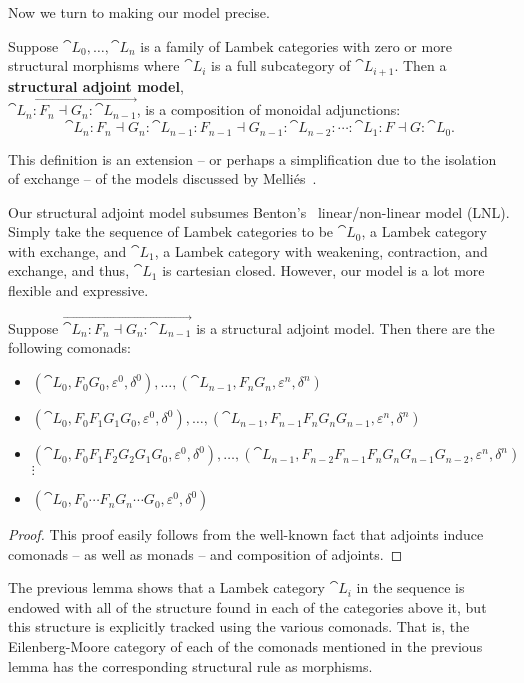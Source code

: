 Now we turn to making our model precise.
\begin{definition}
  \label{def:model}  
  Suppose $\cat{L}_0, \ldots, \cat{L}_n$ is a family of Lambek
  categories with zero or more structural morphisms where $\cat{L}_i$
  is a full subcategory of $\cat{L}_{i+1}$.  Then a \textbf{structural
    adjoint model}, \\ $\overrightarrow{\cat{L}_n : F_n \dashv G_n : \cat{L}_{n-1}}$, is a composition of monoidal adjunctions:
  \[ \cat{L}_n : F_n \dashv G_n : \cat{L}_{n-1} : F_{n-1} \dashv G_{n-1} : \cat{L}_{n-2} : \cdots : \cat{L}_1 : F \dashv G : \cat{L}_0. \]
\end{definition}
This definition is an extension -- or perhaps a simplification due to
the isolation of exchange -- of the models discussed by
Melli\'es~\cite{MELLIES2004202}.

Our structural adjoint model subsumes Benton's~\cite{Benton:1994}
linear/non-linear model (LNL).  Simply take the sequence of Lambek
categories to be $\cat{L}_0$, a Lambek category with exchange, and
$\cat{L}_1$, a Lambek category with weakening, contraction, and
exchange, and thus, $\cat{L}_1$ is cartesian closed.  However, our
model is a lot more flexible and expressive.

\begin{lemma}
  \label{lemma:comonads_in_a_structural_adjoint_model}
  Suppose $\overrightarrow{\cat{L}_n : F_n \dashv G_n : \cat{L}_{n-1}}$ is a structural adjoint model.  Then
  there are the following comonads:  
  \begin{itemize}
  \item $(\cat{L}_0, F_0G_0, \varepsilon^0, \delta^0), \ldots, (\cat{L}_{n-1}, F_nG_n, \varepsilon^{n}, \delta^{n})$
  \item $(\cat{L}_0, F_0F_1G_1G_0, \varepsilon^0, \delta^0), \ldots, (\cat{L}_{n-1}, F_{n-1}F_nG_nG_{n-1}, \varepsilon^{n}, \delta^{n})$
  \item $(\cat{L}_0, F_0F_1F_2G_2G_1G_0, \varepsilon^0, \delta^0), \ldots, (\cat{L}_{n-1}, F_{n-2}F_{n-1}F_nG_nG_{n-1}G_{n-2}, \varepsilon^{n}, \delta^{n})$\\
    $\vdots$
  \item $(\cat{L}_0, F_0 \cdots F_nG_n \cdots G_0, \varepsilon^0, \delta^0)$
  \end{itemize} 
\end{lemma}
\begin{proof}
  This proof easily follows from the well-known fact that adjoints
  induce comonads -- as well as monads -- and composition of adjoints.
\end{proof}
The previous lemma shows that a Lambek category $\cat{L}_i$ in the
sequence is endowed with all of the structure found in each of the
categories above it, but this structure is explicitly tracked using
the various comonads.  That is, the Eilenberg-Moore category of each of the
comonads mentioned in the previous lemma has the corresponding
structural rule as morphisms.

